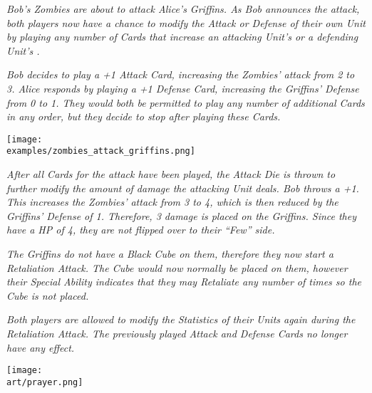 \begin{multicols*}{2}
\textit{Bob's Zombies are about to attack Alice's Griffins.
As Bob announces the attack, both players now have a chance to modify the Attack or Defense of their own Unit by playing any number of  Cards that increase an attacking Unit's  or a defending Unit's .}\par
\textit{Bob decides to play a +1 Attack Card, increasing the Zombies' attack from 2 to 3.
Alice responds by playing a +1 Defense Card, increasing the Griffins' Defense from 0 to 1.
They would both be permitted to play any number of additional Cards in any order, but they decide to stop after playing these Cards.}\par

\texttt{[image: \\examples/zombies\_attack\_griffins.png]}

\textit{After all Cards for the attack have been played, the Attack Die is thrown to further modify the amount of damage the attacking Unit deals.
Bob throws a +1.
This increases the Zombies' attack from 3 to 4, which is then reduced by the Griffins' Defense of 1. Therefore, 3 damage  is placed on the Griffins. Since they have a HP  of 4, they are not flipped over to their ``Few'' side.}\par
\textit{The Griffins do not have a Black Cube on them, therefore they now start a Retaliation Attack.
The Cube would now normally be placed on them, however their Special  Ability indicates that they may Retaliate any number of times so the Cube is not placed.}\par
\textit{Both players are allowed to modify the Statistics of their Units again during the Retaliation Attack.
The previously played Attack and Defense Cards no longer have any effect.}

\vfill

{\texttt{[image: \\art/prayer.png]}}

\end{multicols*}

\clearpage


